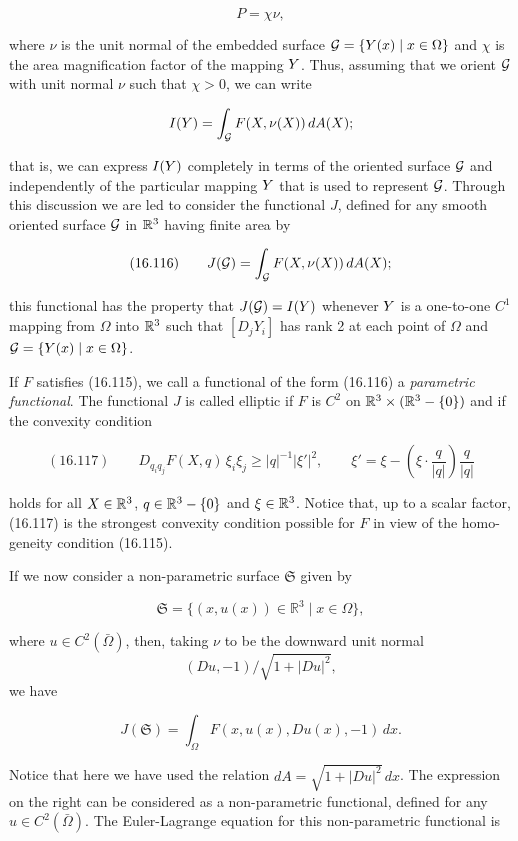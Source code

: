 \[
P=\chi\nu,
\]

where $\nu$ is the unit normal of the embedded surface $\mathcal{G}=\{Y(x)\mid x\in\Omega\}$ and $\chi$ is
the area magnification factor of the mapping $Y$. Thus, assuming that we orient $\mathcal{G}$
with unit normal $\nu$ such that $\chi>0$, we can write

\[
I(Y)=\int_{\mathcal{G}} F(X,\nu(X))\,dA(X);
\]

that is, we can express $I(Y)$ completely in terms of the oriented surface $\mathcal{G}$ and
independently of the particular mapping $Y$ that is used to represent $\mathcal{G}$. Through
this discussion we are led to consider the functional $J$, defined for any smooth
oriented surface $\mathcal{G}$ in $\mathbb{R}^3$ having finite area by

\[
(16.116)\qquad J(\mathcal{G})=\int_{\mathcal{G}} F(X,\nu(X))\,dA(X);
\]

this functional has the property that $J(\mathcal{G})=I(Y)$ whenever $Y$ is a one-to-one $C^1$
mapping from $\Omega$ into $\mathbb{R}^3$ such that $[D_jY_i]$ has rank 2 at each point of $\Omega$ and
$\mathcal{G}=\{Y(x)\mid x\in\Omega\}$.

If $F$ satisfies (16.115), we call a functional of the form (16.116) a \emph{parametric}
\emph{functional}. The functional $J$ is called elliptic if $F$ is $C^2$ on $\mathbb{R}^3\times(\mathbb{R}^3-\{0\})$ and if
the convexity condition

\[
(16.117)\qquad D_{q_i q_j}F(X,q)\,\xi_i\xi_j\ge |q|^{-1}|\xi'|^2,\qquad
\xi'=\xi-\left(\xi\cdot\frac{q}{|q|}\right)\frac{q}{|q|}
\]

holds for all $X\in\mathbb{R}^3$, $q\in\mathbb{R}^3-\{0\}$ and $\xi\in\mathbb{R}^3$. Notice that, up to a scalar factor,
(16.117) is the strongest convexity condition possible for $F$ in view of the homo-
geneity condition (16.115).



If we now consider a non-parametric surface $\mathfrak{S}$ given by

\[
\mathfrak{S}=\{(x,u(x))\in \mathbb{R}^{3}\mid x\in \Omega\},
\]

where $u\in C^{2}(\bar{\Omega})$, then, taking $\nu$ to be the downward unit normal
\[
(Du,-1)/\sqrt{1+|Du|^{2}},
\]
we have

\[
J(\mathfrak{S})=\int_{\Omega}F(x,u(x),Du(x),-1)\,dx.
\]

Notice that here we have used the relation $dA=\sqrt{1+|Du|^{2}}\,dx$. The expression on the
right can be considered as a non-parametric functional, defined for any $u\in C^{2}(\bar{\Omega})$.
The Euler-Lagrange equation for this non-parametric functional is

